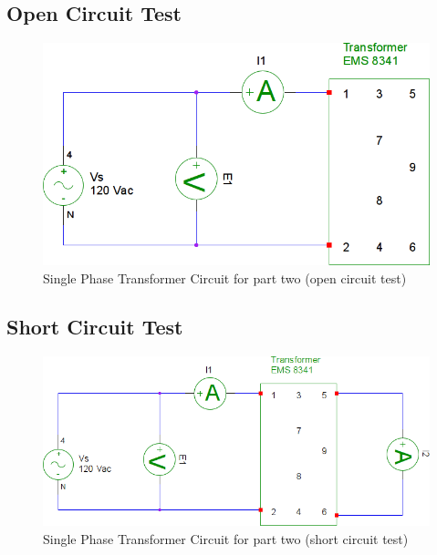 \documentclass{article}
\begin{document}
\subsection*{Open Circuit Test}
\begin{figure}[H]
  \centering
  \includegraphics[width=.8\textwidth]{img/circuit_02}
  \caption{Single Phase Transformer Circuit for part two (open circuit test)}
  \label{fig:circuit_02}
\end{figure}

\subsection*{Short Circuit Test}
\begin{figure}[H]
  \centering
  \includegraphics[width=.8\textwidth]{img/circuit_03}
  \caption{Single Phase Transformer Circuit for part two (short circuit test)}
  \label{fig:circuit_03}
\end{figure}
\end{document}
